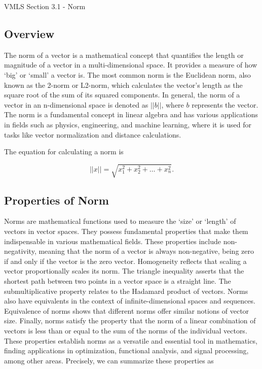 \begin{notes}{VMLS Section 3.1 - Norm}
    \subsection*{Overview}

    The norm of a vector is a mathematical concept that quantifies the length or magnitude of a vector in a multi-dimensional space. It provides a measure of how `big' or `small' a vector is. The most 
    common norm is the Euclidean norm, also known as the 2-norm or L2-norm, which calculates the vector's length as the square root of the sum of its squared components. In general, the norm of a vector 
    in an n-dimensional space is denoted as $||b||$, where $b$ represents the vector. The norm is a fundamental concept in linear algebra and has various applications in fields such as physics, 
    engineering, and machine learning, where it is used for tasks like vector normalization and distance calculations.

    \begin{Highlight}
        The equation for calculating a norm is

        \begin{equation*}
            ||x|| = \sqrt{x^{2}_{1} + x^{2}_{2} + \dots + x^{2}_{n}}.
        \end{equation*}
    \end{Highlight}

    \subsection*{Properties of Norm}

    Norms are mathematical functions used to measure the `size' or `length' of vectors in vector spaces. They possess fundamental properties that make them indispensable in various mathematical fields. 
    These properties include non-negativity, meaning that the norm of a vector is always non-negative, being zero if and only if the vector is the zero vector. Homogeneity reflects that scaling a vector 
    proportionally scales its norm. The triangle inequality asserts that the shortest path between two points in a vector space is a straight line. The submultiplicative property relates to the Hadamard 
    product of vectors. Norms also have equivalents in the context of infinite-dimensional spaces and sequences. Equivalence of norms shows that different norms offer similar notions of vector size. Finally, 
    norms satisfy the property that the norm of a linear combination of vectors is less than or equal to the sum of the norms of the individual vectors. These properties establish norms as a versatile and 
    essential tool in mathematics, finding applications in optimization, functional analysis, and signal processing, among other areas. Precisely, we can summarize these properties as


\end{notes}
